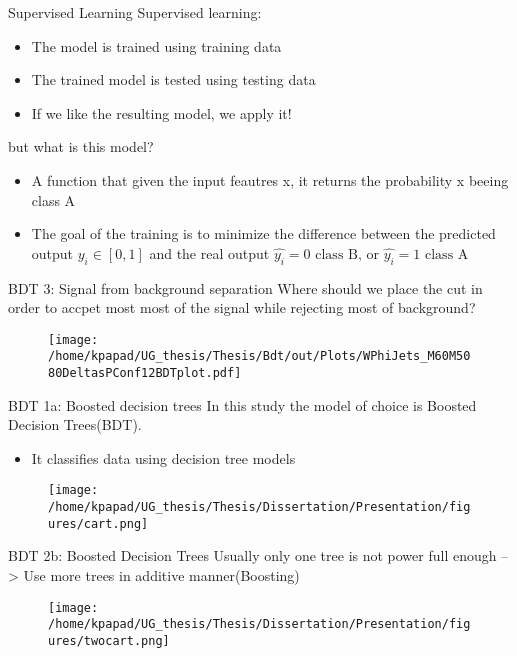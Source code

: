 \documentclass[bigger]{beamer}
\begin{document}
\begin{frame}[label={sec:orgf338327}]{Supervised Learning}
\alert{Supervised learning}:
\begin{itemize}
\item The model is trained using training data
\item The trained model is tested using testing data
\item If we like the resulting model, we apply it!
\end{itemize}

\alert{but what is this model?}
\begin{itemize}
\item A function that given the input feautres x, it returns the probability x beeing class A
\item The goal of the training is to minimize the difference between the predicted output \(y_{i} \in [0, 1]\) and the real output \(\hat{y_{i}} = 0\text{ class B, or }\hat{y_{i}} = 1\text{ class A}\)
\end{itemize}
\end{frame}
\begin{frame}[label={sec:org6665841}]{BDT 3: Signal from background separation}
Where should we place the cut in order to accpet most most of the  signal while rejecting most of background?
\begin{figure}[hb]
\centering
\texttt{[image: /home/kpapad/UG\_thesis/Thesis/Bdt/out/Plots/WPhiJets\_M60M5080DeltasPConf12BDTplot.pdf]}
\end{figure}
\end{frame}
\begin{frame}[label={sec:orgc035812}]{BDT 1a: Boosted decision trees}
In this study the model of choice is Boosted Decision Trees(BDT).
\begin{itemize}
\item It classifies data using decision tree models
\end{itemize}
\begin{figure}[h]
\centering
\texttt{[image: /home/kpapad/UG\_thesis/Thesis/Dissertation/Presentation/figures/cart.png]}
\end{figure}
\end{frame}
\begin{frame}[label={sec:orgf1549a0}]{BDT 2b: Boosted Decision Trees}
Usually only one tree is not power full enough --> Use  more trees in additive manner(Boosting)
\begin{figure}[h]
\centering
\texttt{[image: /home/kpapad/UG\_thesis/Thesis/Dissertation/Presentation/figures/twocart.png]}
\end{figure}
\end{frame}
\end{document}
